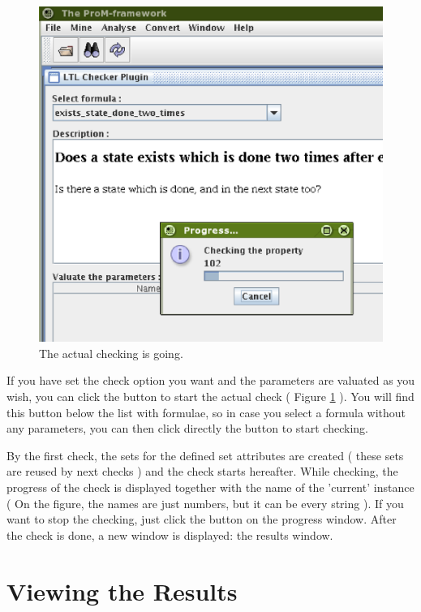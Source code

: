 \begin{figure}[H]
    \includegraphics[scale=0.4]{images/ltlchecker-checking-cutted.eps}
    \caption{The actual checking is going.}
    \label{plugingui:checking}
\end{figure}

If you have set the check option you want and the parameters are valuated as you wish,
you can click the  button to start the actual check ( Figure
\ref{plugingui:checking} ). You will find this  button below the list
with formulae, so in case you select a formula without any parameters, you can
then click directly the  button to start checking.

By the first check, the sets for the defined set
attributes are created ( these sets are reused by next checks ) and the check
starts hereafter. While checking, the progress of the check is displayed together with the name of
the 'current' instance ( On the figure, the names are just numbers, but it can
be every string ). If you want to stop the checking, just click the
 button on the progress window. After the check is done, a new window is displayed: the
results window.

\section{Viewing the Results}
\label{plugingui:results}

